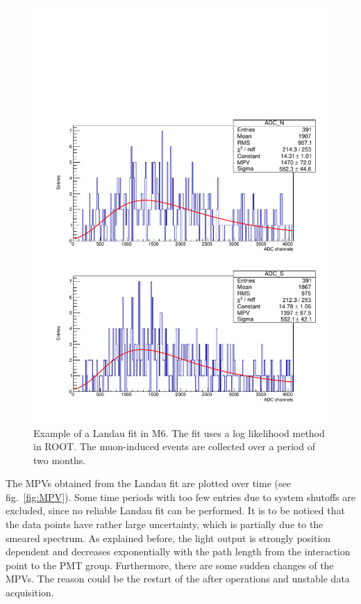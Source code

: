 \begin{figure}[ht]
  \centering
  \includegraphics[width=0.6\textwidth{}]{./fig/LandauFitM6.pdf}
  \caption{Example of a Landau fit in M6. The fit uses a log likelihood method in ROOT. The muon-induced events are collected over a period of two months.}
  \label{fig:Landau_M6}
\end{figure}

The MPVs obtained from the Landau fit are plotted over time (see fig.\ \ref{fig:MPV}). Some time periods with too few entries due to system shutoffs are excluded, since no reliable Landau fit can be performed. It is to be noticed that the data points have rather large uncertainty, which is partially due to the smeared spectrum. As explained before, the light output is strongly position dependent and decreases exponentially with the path length from the interaction point to the PMT group. Furthermore, there are some sudden changes of the MPVs. The reason could be the restart of the \mvs{} after operations and unstable data acquisition.

